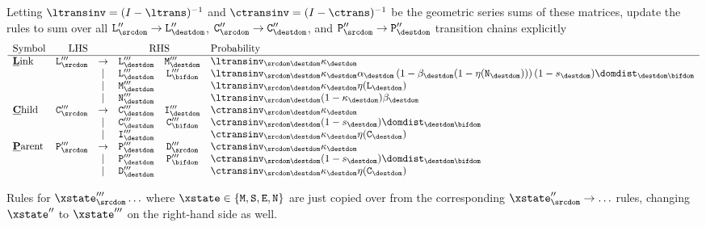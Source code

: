 Letting $\ltransinv=(I-\ltrans)^{-1}$ and $\ctransinv=(I-\ctrans)^{-1}$ be the geometric series sums of these matrices,
update the rules to sum over all
$\ntlinks''_\srcdom\to\ntlinks''_\destdom$,
$\ntchild''_\srcdom\to\ntchild''_\destdom$, and
$\ntparent''_\srcdom\to\ntparent''_\destdom$ transition chains explicitly
\[
\begin{array}{lrcccl}
\mbox{Symbol} & \mbox{LHS} & & \multicolumn{2}{c}{\mbox{RHS}} & \mbox{Probability} \\
\hline
\mbox{\underline{\bf L}ink} &
\ntlinks'''_\srcdom & \to & \ntlinks'''_\destdom & \ntmor'''_\destdom & \ltransinv_{\srcdom\destdom} \kappa_\destdom \\
& & | & \ntlinks'''_\destdom & \ntlinks'''_\bifdom & \ltransinv_{\srcdom\destdom} \kappa_\destdom \alpha_\destdom \left( 1 - \beta_\destdom(1 - \nullability(\ntnew_\destdom)) \right) (1 - \tok_\destdom) \domdist_{\destdom\bifdom} \\
& & | & \ntmor'''_\destdom & & \ltransinv_{\srcdom\destdom} \kappa_\destdom \nullability(\ntlinks_\destdom) \\
& & | & \ntnew'''_\destdom & & \ltransinv_{\srcdom\destdom} (1 - \kappa_\destdom) \beta_\destdom \\
\mbox{\underline{\bf C}hild} & \ntchild'''_\srcdom & \to & \ntchild'''_\destdom & \ntins'''_\destdom & \ctransinv_{\srcdom\destdom} \kappa_\destdom \\
& & | & \ntchild'''_\destdom & \ntchild'''_\bifdom & \ctransinv_{\srcdom\destdom} (1 - \tok_\destdom) \domdist_{\destdom\bifdom} \\
& & | & \ntins'''_\destdom & & \ctransinv_{\srcdom\destdom} \kappa_\destdom \nullability(\ntchild_\destdom) \\
\mbox{\underline{\bf P}arent} & \ntparent'''_\srcdom & \to & \ntparent'''_\destdom & \ntdel'''_\srcdom & \ctransinv_{\srcdom\destdom} \kappa_\destdom \\
& & | & \ntparent'''_\destdom & \ntparent'''_\bifdom & \ctransinv_{\srcdom\destdom} (1 - \tok_\destdom) \domdist_{\destdom\bifdom} \\
& & | & \ntdel'''_\destdom & & \ctransinv_{\srcdom\destdom} \kappa_\destdom \nullability(\ntchild_\destdom) \\
\end{array}
\]



Rules for $\xstate'''_\srcdom\ldots$ where $\xstate \in \{ \ntmor, \ntsur, \ntexp, \ntnew \}$ are just copied over from the corresponding $\xstate''_\srcdom\to\ldots$ rules,
changing $\xstate''$ to $\xstate'''$ on the right-hand side as well.


